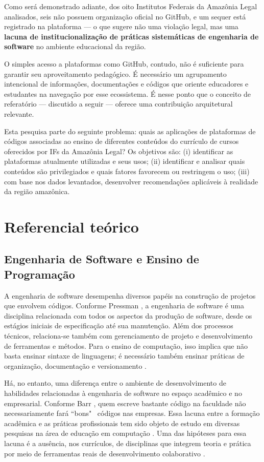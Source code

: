 \documentclass[english, spanish, brazilian]{RBIEarticle}
\begin{document}
Como será demonstrado adiante, dos oito Institutos Federais da Amazônia Legal analisados, seis não possuem organização oficial no GitHub, e um sequer está registrado na plataforma — o que sugere não uma violação legal, mas uma \textbf{lacuna de institucionalização de práticas sistemáticas de engenharia de software} no ambiente educacional da região.

O simples acesso a plataformas como GitHub, contudo, não é suficiente para garantir seu aproveitamento pedagógico. É necessário um agrupamento intencional de informações, documentações e códigos que oriente educadores e estudantes na navegação por esse ecossistema. É nesse ponto que o conceito de referatório — discutido a seguir — oferece uma contribuição arquitetural relevante.

Esta pesquisa parte do seguinte problema: quais as aplicações de plataformas de códigos associadas ao ensino de diferentes conteúdos do currículo de cursos oferecidos por IFs da Amazônia Legal? Os objetivos são: (i) identificar as plataformas atualmente utilizadas e seus usos; (ii) identificar e analisar quais conteúdos são privilegiados e quais fatores favorecem ou restringem o uso; (iii) com base nos dados levantados, desenvolver recomendações aplicáveis à realidade da região amazônica.

\section{Referencial teórico}

\subsection{Engenharia de Software e Ensino de Programação}

A engenharia de software desempenha diversos papéis na construção de projetos que envolvem códigos. Conforme Pressman \cite{pressman2016}, a engenharia de software é uma disciplina relacionada com todos os aspectos da produção de software, desde os estágios iniciais de especificação até sua manutenção. Além dos processos técnicos, relaciona-se também com gerenciamento de projeto e desenvolvimento de ferramentas e métodos. Para o ensino de computação, isso implica que não basta ensinar sintaxe de linguagens; é necessário também ensinar práticas de organização, documentação e versionamento \cite{sommerville2011}.

Há, no entanto, uma diferença entre o ambiente de desenvolvimento de habilidades relacionadas à engenharia de software no espaço acadêmico e no empresarial. Conforme Barr \cite{barr2018}, quem escreve bastante código na faculdade não necessariamente fará ``bons"~ códigos nas empresas. Essa lacuna entre a formação acadêmica e as práticas profissionais tem sido objeto de estudo em diversas pesquisas na área de educação em computação \cite{qian2017}. Uma das hipóteses para essa lacuna é a ausência, nos currículos, de disciplinas que integrem teoria e prática por meio de ferramentas reais de desenvolvimento colaborativo \cite{arcuri2020}.
\end{document}
